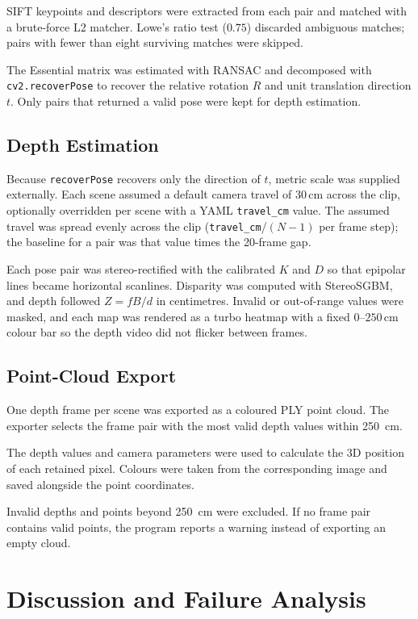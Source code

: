 \documentclass[conference]{assets/latex/IEEEtran}
\begin{document}
SIFT keypoints and descriptors were extracted from each pair
and matched with a brute-force L2 matcher. Lowe's ratio test
($0.75$) discarded ambiguous matches; pairs with fewer than
eight surviving matches were skipped.

The Essential matrix was estimated with RANSAC and decomposed
with \texttt{cv2.recoverPose} to recover the relative rotation
$R$ and unit translation direction $t$. Only pairs that
returned a valid pose were kept for depth estimation.


\subsection{Depth Estimation}

Because \texttt{recoverPose} recovers only the direction of
$t$, metric scale was supplied externally. Each scene assumed
a default camera travel of $30$\,cm across the clip, optionally
overridden per scene with a YAML \texttt{travel\_cm} value.
The assumed travel was spread evenly across the clip
(\texttt{travel\_cm}/$(N{-}1)$ per frame step); the baseline for a
pair was that value times the 20-frame gap.

Each pose pair was stereo-rectified with the calibrated $K$
and $D$ so that epipolar lines became horizontal scanlines.
Disparity was computed with StereoSGBM, and depth followed
$Z = fB/d$ in centimetres. Invalid or out-of-range values
were masked, and each map was rendered as a turbo heatmap
with a fixed $0$--$250$\,cm colour bar so the depth video
did not flicker between frames.


\subsection{Point-Cloud Export}

One depth frame per scene was exported as a coloured
PLY point cloud. The exporter selects the frame pair
with the most valid depth values within 250~cm.

The depth values and camera parameters were used to
calculate the 3D position of each retained pixel.
Colours were taken from the corresponding image
and saved alongside the point coordinates.

Invalid depths and points beyond 250~cm were excluded.
If no frame pair contains valid points, the program
reports a warning instead of exporting an empty cloud.


\section{Discussion and Failure Analysis}
\end{document}
